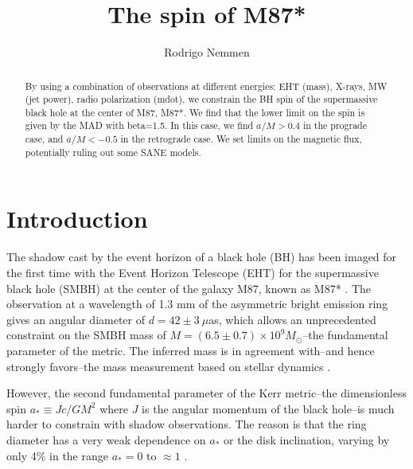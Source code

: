 \documentclass[preprint2]{aastex62}
\begin{document}
\title{The spin of M87*}




\author{Rodrigo Nemmen}

\begin{abstract}
By using a combination of observations at different energies: EHT (mass), X-rays, MW (jet power), radio polarization (mdot), we constrain the BH spin of the supermassive black hole at the center of M87, M87*. 
We find that the lower limit on the spin is given by the MAD with beta=1.5. In this case, we find $a/M>0.4$ in the prograde case, and $a/M<-0.5$ in the retrograde case. 
We set limits on the magnetic flux, potentially ruling out some SANE models.
\end{abstract}






\section{Introduction} \label{sec:intro}

The shadow cast by the event horizon of a black hole (BH) has been imaged for the first time with the Event Horizon Telescope (EHT) for the supermassive black hole (SMBH) at the center of the galaxy M87, known as M87* \citep{EHTC2019}. The observation at a wavelength of 1.3 mm of the asymmetric bright emission ring gives an angular diameter of $d=42 \pm 3 \ \mu$as, which allows an unprecedented constraint on the SMBH mass of $M=(6.5 \pm 0.7) \times 10^9 M_\odot$--the fundamental parameter of the \cite{Kerr1963} metric. The inferred mass is in agreement with--and hence strongly favors--the mass measurement based on stellar dynamics \citep{Gebhardt2011}. 

However, the second fundamental parameter of the Kerr metric--the dimensionless spin $a_* \equiv Jc/GM^2$ where $J$ is the angular momentum of the black hole--is much harder to constrain with shadow observations. The reason is that the ring diameter has a very weak dependence on $a_*$ or the disk inclination, varying by only 4\% in the range $a_*=0$ to $\approx 1$ \citep{Johannsen2010}.
\end{document}
